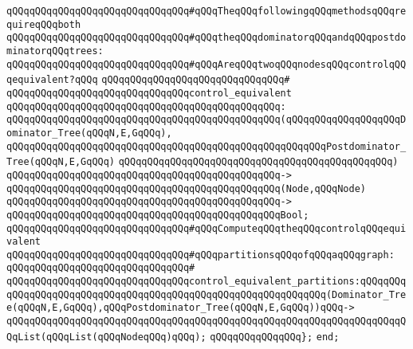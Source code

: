 \newline
\newline
\verb|qQQqqQQqqQQqqQQqqQQqqQQqqQQqqQQq#qQQqTheqQQqfollowingqQQqmethodsqQQqrequireqQQqboth|\newline
\verb|qQQqqQQqqQQqqQQqqQQqqQQqqQQqqQQq#qQQqtheqQQqdominatorqQQqandqQQqpostdominatorqQQqtrees:|\newline
\newline
\verb|qQQqqQQqqQQqqQQqqQQqqQQqqQQqqQQq#qQQqAreqQQqtwoqQQqnodesqQQqcontrolqQQqequivalent?qQQq|\newline
\verb|qQQqqQQqqQQqqQQqqQQqqQQqqQQqqQQq#|\newline
\verb|qQQqqQQqqQQqqQQqqQQqqQQqqQQqqQQqcontrol_equivalent|\newline
\verb|qQQqqQQqqQQqqQQqqQQqqQQqqQQqqQQqqQQqqQQqqQQqqQQq:|\newline
\verb|qQQqqQQqqQQqqQQqqQQqqQQqqQQqqQQqqQQqqQQqqQQqqQQq(qQQqqQQqqQQqqQQqqQQqDominator_Tree(qQQqN,E,GqQQq),|\newline
\verb|qQQqqQQqqQQqqQQqqQQqqQQqqQQqqQQqqQQqqQQqqQQqqQQqqQQqqQQqPostdominator_Tree(qQQqN,E,GqQQq)|\newline
\verb|qQQqqQQqqQQqqQQqqQQqqQQqqQQqqQQqqQQqqQQqqQQqqQQq)|\newline
\verb|qQQqqQQqqQQqqQQqqQQqqQQqqQQqqQQqqQQqqQQqqQQqqQQq->|\newline
\verb|qQQqqQQqqQQqqQQqqQQqqQQqqQQqqQQqqQQqqQQqqQQqqQQq(Node,qQQqNode)|\newline
\verb|qQQqqQQqqQQqqQQqqQQqqQQqqQQqqQQqqQQqqQQqqQQqqQQq->|\newline
\verb|qQQqqQQqqQQqqQQqqQQqqQQqqQQqqQQqqQQqqQQqqQQqqQQqBool;|\newline
\newline
\verb|qQQqqQQqqQQqqQQqqQQqqQQqqQQqqQQq#qQQqComputeqQQqtheqQQqcontrolqQQqequivalent|\newline
\verb|qQQqqQQqqQQqqQQqqQQqqQQqqQQqqQQq#qQQqpartitionsqQQqofqQQqaqQQqgraph:|\newline
\verb|qQQqqQQqqQQqqQQqqQQqqQQqqQQqqQQq#|\newline
\verb|qQQqqQQqqQQqqQQqqQQqqQQqqQQqqQQqcontrol_equivalent_partitions:qQQqqQQq|\newline
\verb|qQQqqQQqqQQqqQQqqQQqqQQqqQQqqQQqqQQqqQQqqQQqqQQqqQQqqQQq(Dominator_Tree(qQQqN,E,GqQQq),qQQqPostdominator_Tree(qQQqN,E,GqQQq))qQQq->|\newline
\verb|qQQqqQQqqQQqqQQqqQQqqQQqqQQqqQQqqQQqqQQqqQQqqQQqqQQqqQQqqQQqqQQqqQQqqQQqList(qQQqList(qQQqNodeqQQq)qQQq);|\newline
\newline
\verb|qQQqqQQqqQQqqQQq};|\newline
\verb|end;|\newline

